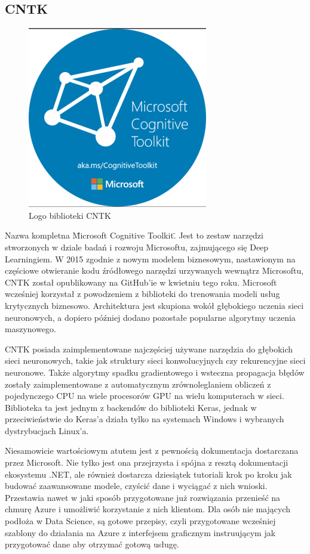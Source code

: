 \documentclass[12pt,a4paper,twoside,titlepage,openright]{book}
\begin{document}
\subsection{CNTK}
\begin{figure}[h]
	\centering
			\includegraphics[resolution=120]{CNTK.png}
		\caption{Logo biblioteki CNTK}
\end{figure}
Nazwa kompletna \"Microsoft Cognitive Toolkit\". Jest to zestaw narzędzi stworzonych w dziale badań i rozwoju Microsoftu, zajmującego się Deep Learningiem. W 2015 zgodnie z nowym modelem biznesowym, nastawionym na częściowe otwieranie kodu źródłowego narzędzi urzywanych wewnątrz Microsoftu, CNTK został opublikowany na GitHub'ie w kwietniu tego roku. Microsoft wcześniej korzystał z powodzeniem z biblioteki do trenowania modeli usług krytycznych biznesowo. Architektura jest skupiona wokół głębokiego uczenia sieci neuronowych, a dopiero później dodano pozostałe popularne algorytmy uczenia maszynowego.

CNTK posiada zaimplementowane najczęściej używane narzędzia do głębokich sieci neuronowych, takie jak struktury sieci konwolucyjnych czy rekurencyjne sieci neuronowe. Także algorytmy spadku gradientowego i wsteczna propagacja błędów zostały zaimplementowane z automatycznym zrównoleglaniem obliczeń z pojedynczego CPU na wiele procesorów GPU na wielu komputerach w sieci. Biblioteka ta jest jednym z backendów do biblioteki Keras, jednak w przeciwieństwie do Keras'a działa tylko na systemach Windows i wybranych dystrybucjach Linux'a.

Niesamowicie wartościowym atutem jest z pewnością dokumentacja dostarczana przez Microsoft. Nie tylko jest ona przejrzysta i spójna z resztą dokumentacji ekosystemu .NET, ale również dostarcza dziesiątek tutoriali krok po kroku jak budować zaawansowane modele, czyścić dane i wyciągać z nich wnioski. Przestawia nawet w jaki sposób przygotowane już rozwiązania przenieść na chmurę Azure i umożliwić korzystanie z nich klientom. Dla osób nie mających podłoża w Data Science, są gotowe przepisy, czyli przygotowane wcześniej szablony do działania na Azure z interfejsem graficznym instruującym jak przygotować dane aby otrzymać gotową usługę.
\end{document}
